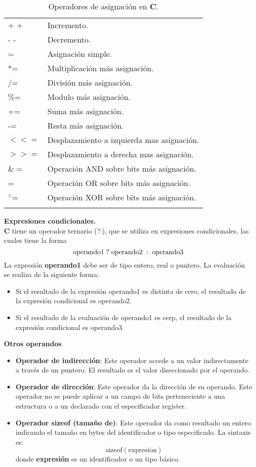 \documentclass[12pt, A4]{article}
\begin{document}
{{\begin{longtable}[h]{p{3cm} p{10cm}}
	\endlastfoot
	 + + & Incremento. \\
\rowcolor{gray!20}	 -\hspace{0.1 cm} -& Decremento. \\
	= & Asignación simple. \\
\rowcolor{gray!20}	*= & Multiplicación más asignación. \\
	/= & División más asignación. \\
\rowcolor{gray!20}	\%= & Modulo más asignación. \\
	+= & Suma más asignación.\\
\rowcolor{gray!20}	-= & Resta más asignación.\\
	$<<=$ & Desplazamiento a izquierda mas asignación. \\
\rowcolor{gray!20}	$>>=$ & Desplazamiento a derecha mas asignación. \\
	$\&=$ & Operación AND sobre bits más asignación. \\
\rowcolor{gray!20}	= & Operación OR sobre bits más asignación. \\
	$^{\wedge}$= & Operación XOR sobre bits más asignación. \\ \hline 
	\caption{Operadores de asignación en \textbf{C}.}
\end{longtable}
 \textbf{{{\Large } Expresiones condicionales.  }}\\
 \textbf{C} tiene un operador ternario (?:), que se utiliza en expresiones condicionales, las cuales tiene la forma
 $$\mathrm{operando1 \hspace{0.1 cm}?\hspace{0.1 cm} operando2\hspace{0.1 cm} :\hspace{0.1 cm} operando3}$$
 La expresión \textbf{operando1} debe ser de tipo entero, real o puntero. La evaluación se realiza de la siguiente forma:
 \begin{itemize}
 	\item Si el resultado de la expresión operando1 es distinta de cero, el resultado de la expresión condicional es operando2.
 	\item Si el resultado de la evaluación de operando1 es cerp, el resultado de la expresión condicional es operando3. 
 \end{itemize}
 \textbf{{{\Large } Otros operandos  }}
 \begin{itemize}
 	\item \textbf{Operador de indirección}: Este operador accede a un valor indirectamente a través de un puntero. El resultado es el valor diseccionado por el operando. 
 	\item \textbf{Operador de dirección}: Este operador da la dirección de su operando. Este operador no se puede aplicar a un campo de bits perteneciente a una estructura o a un declarado con el especificador register.
 	\item \textbf{Operador sizeof (tamaño de)}: Este operador da como resultado un entero indicando el tamaño en bytes del identificador o tipo especificado. La sintaxis es: $$\mathrm{sizeof(expresi\acute{o}n)}$$ donde \textbf{expresión} es un identificador o un tipo básico.
 \end{itemize}


}}
\end{document}
